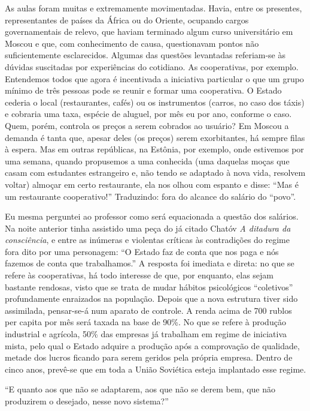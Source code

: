 As aulas foram muitas e extremamente movimentadas. Havia, entre os
presentes, representantes de países da África ou do Oriente, ocupando
cargos governamentais de relevo, que haviam terminado algum curso
universitário em Moscou e que, com conhecimento de causa, questionavam
pontos não suficientemente esclarecidos. Algumas das questões levantadas
referiam-se às dúvidas suscitadas por experiências do cotidiano. As
cooperativas, por exemplo. Entendemos todos que agora é incentivada a
iniciativa particular o que um grupo mínimo de três pessoas pode se
reunir e formar uma cooperativa. O Estado cederia o local (restaurantes,
cafés) ou os instrumentos (carros, no caso dos táxis) e cobraria uma
taxa, espécie de aluguel, por mês eu por ano, conforme o caso. Quem,
porém, controla os preços a serem cobrados ao usuário? Em Moscou a
demanda é tanta que, apesar deles (os preços) serem exorbitantes, há
sempre filas à espera. Mas em outras repúblicas, na Estônia, por
exemplo, onde estivemos por uma semana, quando propusemos a uma
conhecida (uma daquelas moças que casam com estudantes estrangeiro e,
não tendo se adaptado à nova vida, resolvem voltar) almoçar em certo
restaurante, ela nos olhou com espanto e disse: ``Mas é um restaurante
cooperativo!'' Traduzindo: fora do alcance do salário do ``povo''.

Eu mesma perguntei ao professor como será equacionada a questão dos
salários. Na noite anterior tinha assistido uma peça do já citado Chatóv
\emph{A ditadura da consciência}, e entre as inúmeras e violentas
críticas às contradições do regime fora dito por uma personagem: ``O
Estado faz de conta que nos paga e nós fazemos de conta que
trabalhamos.'' A resposta foi imediata e direta: no que se refere às
cooperativas, há todo interesse de que, por enquanto, elas sejam
bastante rendosas, visto que se trata de mudar hábitos psicológicos
``coletivos'' profundamente enraizados na população. Depois que a nova
estrutura tiver sido assimilada, pensar-se-á num aparato de controle. A
renda acima de 700 rublos per capita por mês será taxada na base de
90\%. No que se refere à produção industrial e agrícola, 50\% das
empresas já trabalham em regime de iniciativa mista, pelo qual o Estado
adquire a produção após a comprovação de qualidade, metade dos lucros
ficando para serem geridos pela própria empresa. Dentro de cinco anos,
prevê-se que em toda a União Soviética esteja implantado esse regime.

``E quanto aos que não se adaptarem, aos que não se derem bem, que não
produzirem o desejado, nesse novo sistema?''

